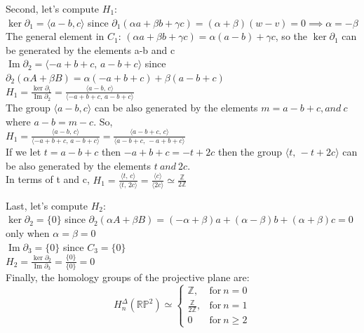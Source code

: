 \documentclass[11pt,a4paper]{report}
\DeclareMathOperator{\Ima}{Im}
\begin{document}
\par
Second, let's compute $H_1$: \\
$\ker\partial_1 = \langle a-b,c \rangle$
		since $\partial_1(\alpha a + \beta b + \gamma c) = (\alpha + \beta)(w-v) = 0  \implies \alpha = -\beta$ \\
The general element in $C_1$: $ (\alpha a + \beta b + \gamma c)= \alpha(a-b) + \gamma c $,
so the $\ker\partial_1$ can be generated by the elements a-b and c \\
$\Ima\partial_2 = \langle -a+b+c,\, a-b+c \rangle $
		since $\partial_2(\alpha A + \beta B) = \alpha(-a+b+c) + \beta(a-b+c)$ \\
$H_1 = \frac{\ker\partial_1}{\Ima\partial_2} =
		\frac{ \langle a-b, \,c \rangle  }{ \langle -a+b+c,\, a-b+c \rangle }$\\
The group $\langle a-b, c \rangle$ can be also generated by the elements
		$ m=a-b+c, and \: c $ where $ a - b = m -c $. So, \\
$H_1 = \frac{ \langle a-b, \,c \rangle  }{ \langle -a+b+c,\, a-b+c \rangle } = \frac{ \langle a-b+c, \, c \rangle  }{ \langle a-b+c,\, -a+b+c \rangle } $ \\
If we let $t=a-b+c$ then $-a+b+c = -t + 2c $ then the group $\langle t,\, -t+2c \rangle$ can be also generated by the elements $ t \: and \: 2c $. \\
In terms of t and c, $H_1 = \frac{ \langle t, \,c \rangle  }{ \langle t,\, 2c \rangle } = \frac{  \langle c \rangle  }{ \langle 2c \rangle } \simeq \frac{\mathbb{Z}}{2\mathbb{Z}}$ \\

\par
Last, let's compute $H_2$: \\
$\ker\partial_2 = \{0\}$
		since $\partial_2(\alpha A + \beta B) = (-\alpha+\beta)a +  (\alpha-\beta)b + (\alpha+\beta)c = 0 $ only when $\alpha = \beta = 0$\\
$\Ima\partial_3 = \{0\}$ since $C_3 = \{0\}$ \\
$H_2 = \frac{\ker\partial_2}{\Ima\partial_3} =
		\frac{\{0\} }{\{0\}} = 0 $ \\

Finally, the homology groups of the projective plane are:
		\[
	  		H_n^\Delta(\mathbb{R} \mathbb{P}^2) \simeq \left\{
			      \begin{array}{rl}
			     \mathbb{Z}, & \textrm{for} \: n = 0\\
			     \frac{\mathbb{Z}}{2\mathbb{Z}}, & \textrm{for} \: n = 1\\
                        0 & \textrm{for} \: n \geqslant 2
			      \end{array}
			 \right.
	  	\]
\end{document}
